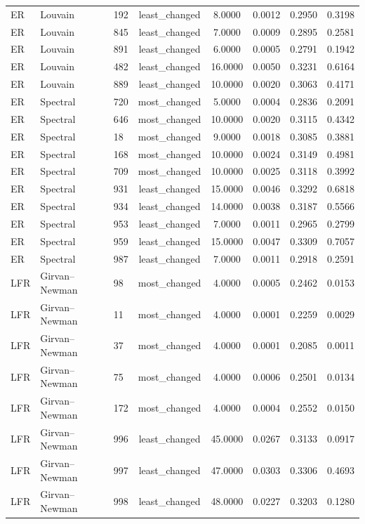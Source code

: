 \begin{longtable}{lllccccc}
ER & Louvain & 192 & least\_changed & 8.0000 & 0.0012 & 0.2950 & 0.3198 \\
ER & Louvain & 845 & least\_changed & 7.0000 & 0.0009 & 0.2895 & 0.2581 \\
ER & Louvain & 891 & least\_changed & 6.0000 & 0.0005 & 0.2791 & 0.1942 \\
ER & Louvain & 482 & least\_changed & 16.0000 & 0.0050 & 0.3231 & 0.6164 \\
ER & Louvain & 889 & least\_changed & 10.0000 & 0.0020 & 0.3063 & 0.4171 \\
ER & Spectral & 720 & most\_changed & 5.0000 & 0.0004 & 0.2836 & 0.2091 \\
ER & Spectral & 646 & most\_changed & 10.0000 & 0.0020 & 0.3115 & 0.4342 \\
ER & Spectral & 18 & most\_changed & 9.0000 & 0.0018 & 0.3085 & 0.3881 \\
ER & Spectral & 168 & most\_changed & 10.0000 & 0.0024 & 0.3149 & 0.4981 \\
ER & Spectral & 709 & most\_changed & 10.0000 & 0.0025 & 0.3118 & 0.3992 \\
ER & Spectral & 931 & least\_changed & 15.0000 & 0.0046 & 0.3292 & 0.6818 \\
ER & Spectral & 934 & least\_changed & 14.0000 & 0.0038 & 0.3187 & 0.5566 \\
ER & Spectral & 953 & least\_changed & 7.0000 & 0.0011 & 0.2965 & 0.2799 \\
ER & Spectral & 959 & least\_changed & 15.0000 & 0.0047 & 0.3309 & 0.7057 \\
ER & Spectral & 987 & least\_changed & 7.0000 & 0.0011 & 0.2918 & 0.2591 \\
LFR & Girvan--Newman & 98 & most\_changed & 4.0000 & 0.0005 & 0.2462 & 0.0153 \\
LFR & Girvan--Newman & 11 & most\_changed & 4.0000 & 0.0001 & 0.2259 & 0.0029 \\
LFR & Girvan--Newman & 37 & most\_changed & 4.0000 & 0.0001 & 0.2085 & 0.0011 \\
LFR & Girvan--Newman & 75 & most\_changed & 4.0000 & 0.0006 & 0.2501 & 0.0134 \\
LFR & Girvan--Newman & 172 & most\_changed & 4.0000 & 0.0004 & 0.2552 & 0.0150 \\
LFR & Girvan--Newman & 996 & least\_changed & 45.0000 & 0.0267 & 0.3133 & 0.0917 \\
LFR & Girvan--Newman & 997 & least\_changed & 47.0000 & 0.0303 & 0.3306 & 0.4693 \\
LFR & Girvan--Newman & 998 & least\_changed & 48.0000 & 0.0227 & 0.3203 & 0.1280 \\

\end{longtable}
